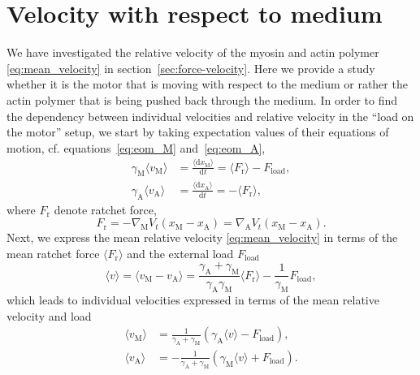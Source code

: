 \documentclass[aps,pre,twocolumn,showpacs,showkeys,superscriptaddress,floatfix]{revtex4-1}
\newcommand{\rmd}{{\mathrm d}}
\begin{document}
\section{Velocity with respect to medium}
\label{sec:ind_velo}
We have investigated the relative velocity of the myosin and actin polymer \eqref{eq:mean_velocity} in section~\ref{sec:force-velocity}. 
Here we provide a study whether it is the motor that is moving with respect to the medium or rather the actin polymer that is being pushed back through the medium.
In order to find the dependency between individual velocities and relative velocity in the ``load on the motor'' setup, 
we start by taking expectation values of their equations of motion, cf. equations~\eqref{eq:eom_M} and~\eqref{eq:eom_A},
\begin{align}
\gamma_\text{M} \langle v_\text{M} \rangle &= \frac{ \langle \rmd x_\text{M} \rangle }{\rmd t} = \langle F_\text{r} \rangle - F_\text{load} , 
\label{eq:pre_velocity_M} 
\\
\gamma_\text{A} \langle v_\text{A} \rangle &= \frac{ \langle \rmd x_\text{A} \rangle }{\rmd t} = -\langle F_\text{r} \rangle , 
\label{eq:pre_velocity_A}
\end{align}
where $F_\text{r}$ denote ratchet force, 
\begin{equation}
F_\text{r} = - \nabla_\text{M} V_t( x_\text{M} - x_\text{A} ) = \nabla_\text{A} V_t(x_\text{M} - x_\text{A} ) . 
\label{eq:ratchet_force}
\end{equation}
Next, we express the mean relative velocity \eqref{eq:mean_velocity} in terms of the mean ratchet force $\langle F_\text{r} \rangle$ and the external load $F_\text{load}$  
\begin{equation}
\langle v \rangle 
= \langle v_\text{M} - v_\text{A} \rangle 
= \frac{\gamma_\text{A} + \gamma_\text{M}}{\gamma_\text{A} \gamma_\text{M}} \langle F_\text{r} \rangle - \frac{1}{\gamma_\text{M}} F_\text{load} ,
\label{eq:mean_velocity_Fr_Fl}
\end{equation}
which leads to individual velocities expressed in terms of the mean relative velocity and load 
\begin{align}
\langle v_\text{M} \rangle &= \frac{1}{ \gamma_\text{A} + \gamma_\text{M} } \left( \gamma_\text{A} \langle v \rangle - F_\text{load} \right) ,
\label{eq:velocity_M} \\
\langle v_\text{A} \rangle &= -\frac{1}{ \gamma_\text{A} + \gamma_\text{M} } \left( \gamma_\text{M} \langle v \rangle + F_\text{load} \right) .
\label{eq:velocity_A}
\end{align}
\end{document}
